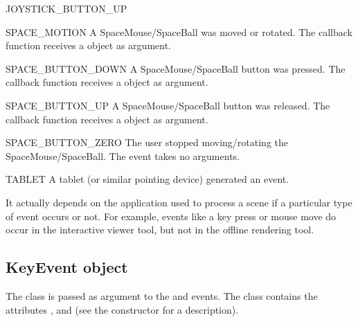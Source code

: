 \begin{datadesc}{JOYSTICK_BUTTON_UP}
\end{datadesc}


\begin{datadesc}{SPACE_MOTION}
A SpaceMouse/SpaceBall was moved or rotated. The callback function receives a
 object as argument.
\end{datadesc}

\begin{datadesc}{SPACE_BUTTON_DOWN}
A SpaceMouse/SpaceBall button was pressed. The callback function receives a
 object as argument.
\end{datadesc}

\begin{datadesc}{SPACE_BUTTON_UP}
A SpaceMouse/SpaceBall button was released. The callback function receives a
 object as argument.
\end{datadesc}

\begin{datadesc}{SPACE_BUTTON_ZERO}
The user stopped moving/rotating the SpaceMouse/SpaceBall. The event takes
no arguments.
\end{datadesc}


\begin{datadesc}{TABLET}
A tablet (or similar pointing device) generated an event.
\end{datadesc}


\begin{notice}[note]
It actually depends on the application used to process a scene if a
particular type of event occurs or not. For example, events like a key press
or mouse move do occur in the interactive viewer tool, but not in the
offline rendering tool.
\end{notice}

\subsection{KeyEvent object}

The  class is passed as argument to the 
and  events. The class contains the attributes
,  and  (see the constructor for
a description).

